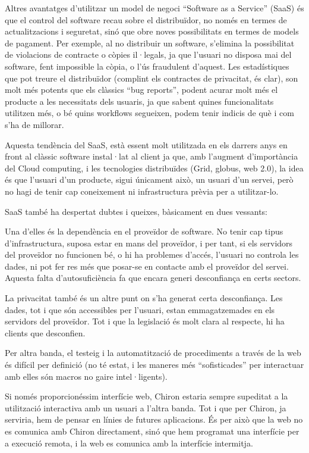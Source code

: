 Altres avantatges d'utilitzar un model de negoci ``Software as a Service''
(SaaS) és que el control del software recau sobre el distribuïdor, no només en
termes de actualitzacions i seguretat, sinó que obre noves possibilitats en
termes de models de pagament.   Per exemple, al no distribuir un software,
s'elimina la possibilitat de violacions de contracte o còpies il·legals, ja que
l'usuari no disposa mai del software, fent impossible la còpia, o l'ús
fraudulent d'aquest.  Les estadístiques que pot treure el distribuïdor (complint
els contractes de privacitat, és clar), son molt més potents que els clàssics
``bug reports'', podent acurar molt més el producte a les necessitats dels
usuaris, ja que sabent quines funcionalitats utilitzen més, o bé quins workflows
segueixen, podem tenir indicis de què i com s'ha de millorar.

Aquesta tendència del SaaS, està essent molt utilitzada en els darrers anys en
front al clàssic software instal·lat al client ja que, amb l'augment d'importància
del Cloud computing, i les tecnologies distribuïdes (Grid, globus, web 2.0), la
idea és que l'usuari d'un producte, sigui únicament això, un usuari d'un servei,
però no hagi de tenir cap coneixement ni infrastructura prèvia per a
utilitzar-lo.

SaaS també ha despertat dubtes i queixes, bàsicament en dues vessants:

Una d'elles és la dependència en el proveïdor de software.  No tenir cap tipus
d'infrastructura, suposa estar en mans del proveïdor, i per tant, si els
servidors del proveïdor no funcionen bé, o hi ha problemes d'accés, l'usuari
no controla les dades, ni pot fer res més que posar-se en contacte amb el
proveïdor del servei.  Aquesta falta d'autosuficiència fa que encara generi
desconfiança en certs sectors.

La privacitat també és un altre punt on s'ha generat certa desconfiança.  Les
dades, tot i que són accessibles per l'usuari, estan emmagatzemades en els
servidors del proveïdor.  Tot i que la legislació és molt clara al respecte,
hi ha clients que desconfien.

Per altra banda, el testeig i la automatització de procediments a través de la
web és difícil per definició (no té estat, i les maneres més ``sofisticades''
per interactuar amb elles són macros no gaire intel·ligents).

Si només proporcionéssim interfície web, Chiron estaria sempre supeditat a la
utilització interactiva amb un usuari a l'altra banda.  Tot i que per Chiron, ja
serviria, hem de pensar en línies de futures aplicacions.  És per això que la
web no es comunica amb Chiron directament, sinó que hem programat una interfície
per a execució remota, i la web es comunica amb la interfície intermitja.

